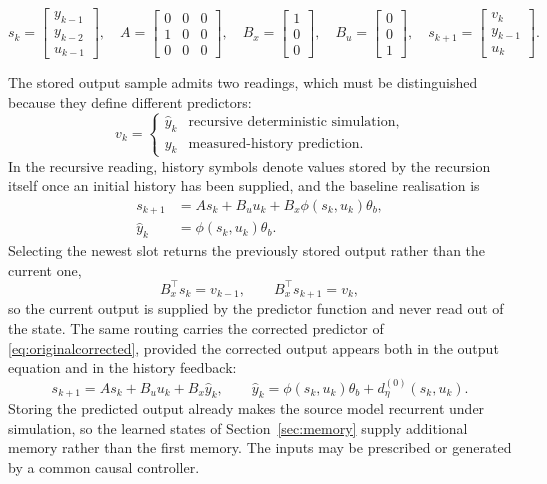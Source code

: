 \documentclass[11pt,a4paper]{article}
\theoremstyle{remark}
\begin{document}
\begin{equation*}
s_k=\begin{bmatrix}y_{k-1}\\y_{k-2}\\u_{k-1}\end{bmatrix},\quad
A=\begin{bmatrix}0&0&0\\1&0&0\\0&0&0\end{bmatrix},\quad
B_x=\begin{bmatrix}1\\0\\0\end{bmatrix},\quad
B_u=\begin{bmatrix}0\\0\\1\end{bmatrix},\quad
s_{k+1}=\begin{bmatrix}v_k\\y_{k-1}\\u_k\end{bmatrix}.
\end{equation*}

The stored output sample admits two readings, which must be distinguished because they define
different predictors:
\begin{equation}\label{eq:feedback}
v_k=\begin{cases}\hat y_k&\text{recursive deterministic simulation},\\
y_k&\text{measured-history prediction}.\end{cases}
\end{equation}
In the recursive reading, history symbols denote values stored by the recursion itself once an
initial history has been supplied, and the baseline realisation is
\begin{equation}\label{eq:baselineSS}
\boxed{\begin{aligned}
s_{k+1}&=As_k+B_uu_k+B_x\phi(s_k,u_k)\theta_b,\\
\hat y_k&=\phi(s_k,u_k)\theta_b.
\end{aligned}}
\end{equation}
Selecting the newest slot returns the previously stored output rather than the current one,
\begin{equation*}
B_x^\top s_k=v_{k-1},\qquad B_x^\top s_{k+1}=v_k,
\end{equation*}
so the current output is supplied by the predictor function and never read out of the state. The
same routing carries the corrected predictor of \eqref{eq:originalcorrected}, provided the
corrected output appears both in the output equation and in the history feedback:
\begin{equation*}
s_{k+1}=As_k+B_uu_k+B_x\hat y_k,\qquad
\hat y_k=\phi(s_k,u_k)\theta_b+d_\eta^{(0)}(s_k,u_k).
\end{equation*}
Storing the predicted output already makes the source model recurrent under simulation, so the
learned states of Section~\ref{sec:memory} supply additional memory rather than the first memory.
The inputs may be prescribed or generated by a common causal controller.
\end{document}
